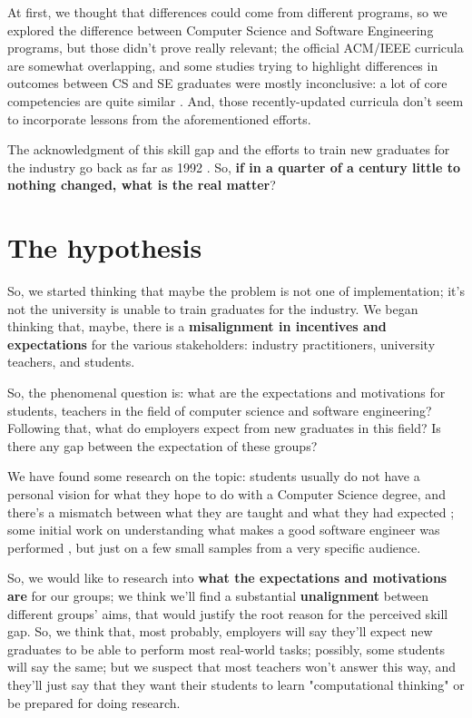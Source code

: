 \documentclass{sigchi}
\begin{document}
At first, we thought that differences could come from different programs, so we explored the difference between Computer Science and Software Engineering programs, but those didn't prove really relevant; the official ACM/IEEE curricula \cite{Force2013} \cite{Ardis2015} are somewhat overlapping, and some studies trying to highlight differences in outcomes between CS and SE graduates were mostly inconclusive: a lot of core competencies are quite similar \cite{Meziane2004} \cite{Rasool2014}. And, those recently-updated curricula don't seem to incorporate lessons from the aforementioned efforts.\newline

The acknowledgment of this skill gap and the efforts to train new graduates for the industry go back as far as 1992 \cite{Dawson1992}. So, \textbf{if in a quarter of a century little to nothing changed, what is the real matter}?	

\section{The hypothesis}
So, we started thinking that maybe the problem is not one of implementation; it's not the university is unable to train graduates for the industry. We began thinking that, maybe, there is a \textbf{misalignment in incentives and expectations} for the various stakeholders: industry practitioners, university teachers, and students.\newline

 So, the phenomenal question is: what are the expectations and motivations for students, teachers in the field of computer science and software engineering? Following that, what do employers expect from new graduates in this field? Is there any gap between the expectation of these groups?\newline
 
 We have found some research on the topic: students usually do not have a personal vision for what they hope to do with a Computer Science degree, and there's a mismatch between what they are taught and what they had expected \cite{Hewner2011}; some initial work on understanding what makes a good software engineer was performed \cite{Li2015}, but just on a few small samples from a very specific audience.\newline
 
 So, we would like to research into \textbf{what the expectations and motivations are} for our groups; we think we'll find a substantial \textbf{unalignment} between different groups' aims, that would justify the root reason for the perceived skill gap. So, we think that, most probably, employers will say they'll expect new graduates to be able to perform most real-world tasks; possibly, some students will say the same; but we suspect that most teachers won't answer this way, and they'll just say that they want their students to learn "computational thinking" or be prepared for doing research.
 
\end{document}
